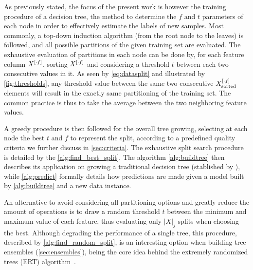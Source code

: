 As previously stated, the focus of the present work is however the training procedure of a decision tree, the method to determine the $f$ and $t$ parameters of each node in order to effectively estimate the labels of new samples. Most commonly, a top-down induction algorithm (from the root node to the leaves) is followed, and all possible partitions of the given training set are evaluated.
The exhaustive evaluation of partitions in each node can be done by, for each feature column $X^{[\cdot f]}$, sorting $X^{[\cdot f]}$ and considering a threshold $t$ between each two consecutive values in it. As seen by \autoref{eq:datasplit} and illustrated by \autoref{fig:thresholds}, any threshold value between the same two consecutive $X^{[\cdot f]}_\text{sorted}$ elements will result in the exactly same partitioning of the training set. The common practice is thus to take the average between the two neighboring feature values.

A greedy procedure is then followed for the overall tree growing, selecting at each node the best $t$ and $f$ to represent the split, according to a predefined quality criteria we further discuss in \autoref{sec:criteria}.
%
The exhaustive split search procedure is detailed by the \autoref{alg:find_best_split}. The algorithm \ref{alg:buildtree} then describes its application on growing a traditional decision tree (stablished by \textcite{breiman1984classification}),
while \ref{alg:predict} formally details how predictions are made given a model built by \ref{alg:buildtree} and a new data instance.

\algPredict
\algBuildTree
\algFindBestSplit

An alternative to avoid considering all partitioning options and greatly reduce the amount of operations is to draw a random threshold $t$ between the minimum and maximum value of each feature, thus evaluating only $|X|_j$ splits when choosing the best. Although degrading the performance of a single tree, this procedure, described by \ref{alg:find_random_split}, is an interesting option when building tree ensembles (\autoref{sec:ensembles}), being the core idea behind the extremely randomized trees (ERT) algorithm~\cite{geurts2006extremely}.

\algFindRandomSplit

